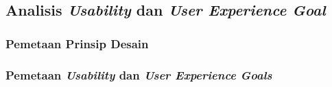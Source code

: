 \subsection{Analisis \textit{Usability} dan \textit{User Experience Goal}}




\subsubsection{Pemetaan Prinsip Desain}


\subsubsection{Pemetaan \textit{Usability} dan \textit{User Experience Goals}}








